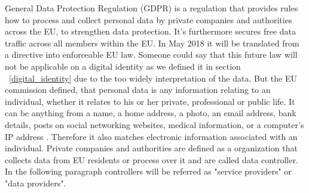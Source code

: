 General Data Protection Regulation (GDPR) is a regulation that provides rules how to process and collect personal data by private companies and authorities across the EU, to strengthen data protection. It's furthermore secures free data traffic across all members within the EU. In May 2018 it will be translated from a directive into enforceable EU law. 
Someone could say that this future law will not be applicable on a digital identity as we defined it in section ~\ref{digital_identity} due to the too widely interpretation of the data. But the EU commission defined, that personal data is any information relating to an individual, whether it relates to his or her private, professional or public life. It can be anything from a name, a home address, a photo, an email address, bank details, posts on social networking websites, medical information, or a computer’s IP address \cite{personalData} . Therefore it also matches electronic information associated with an individual. 
Private companies and authorities are defined as a organization that collects data from EU residents or process over it and are called data controller. 
In the following paragraph controllers will be referred as "service providers" or "data providers".

